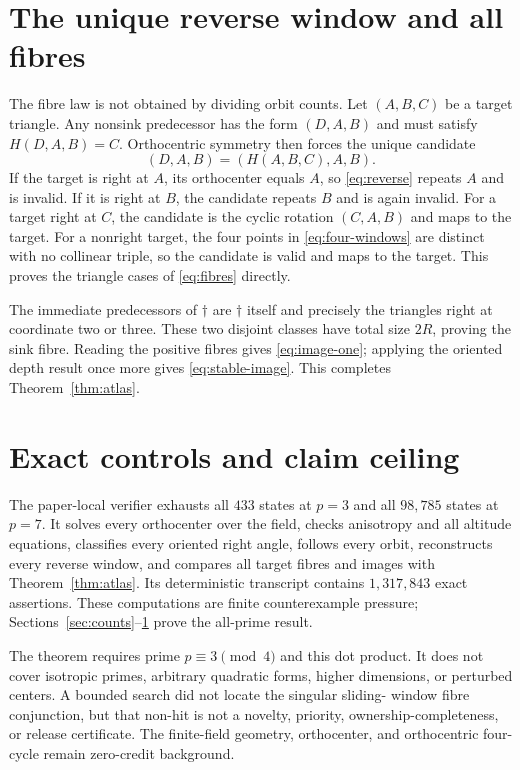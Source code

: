 \documentclass[a4paper,10pt]{amsart}
\theoremstyle{remark}
\begin{document}
\section{The unique reverse window and all fibres}\label{sec:inverse}

The fibre law is not obtained by dividing orbit counts.  Let $(A,B,C)$ be a
target triangle.  Any nonsink predecessor has the form $(D,A,B)$ and must
satisfy $H(D,A,B)=C$.  Orthocentric symmetry then forces the unique candidate
\begin{equation}\label{eq:reverse}
 (D,A,B)=(H(A,B,C),A,B).
\end{equation}
If the target is right at $A$, its orthocenter equals $A$, so
\eqref{eq:reverse} repeats $A$ and is invalid.  If it is right at $B$, the
candidate repeats $B$ and is again invalid.  For a target right at $C$, the
candidate is the cyclic rotation $(C,A,B)$ and maps to the target.  For a
nonright target, the four points in \eqref{eq:four-windows} are distinct with
no collinear triple, so the candidate is valid and maps to the target.
This proves the triangle cases of \eqref{eq:fibres} directly.

The immediate predecessors of $\dagger$ are $\dagger$ itself and precisely
the triangles right at coordinate two or three.  These two disjoint classes
have total size $2R$, proving the sink fibre.  Reading the positive fibres
gives \eqref{eq:image-one}; applying the oriented depth result once more gives
\eqref{eq:stable-image}.  This completes Theorem~\ref{thm:atlas}.

\section{Exact controls and claim ceiling}\label{sec:controls}

The paper-local verifier exhausts all $433$ states at $p=3$ and all
$98{,}785$ states at $p=7$.  It solves every orthocenter over the field,
checks anisotropy and all altitude equations, classifies every oriented right
angle, follows every orbit, reconstructs every reverse window, and compares
all target fibres and images with Theorem~\ref{thm:atlas}.  Its deterministic
transcript contains $1{,}317{,}843$ exact assertions.  These computations are
finite counterexample pressure; Sections~\ref{sec:counts}--\ref{sec:inverse}
prove the all-prime result.

The theorem requires prime $p\equiv3\pmod4$ and this dot product.  It does
not cover isotropic primes, arbitrary quadratic forms, higher dimensions, or
perturbed centers.  A bounded search did not locate the singular sliding-
window fibre conjunction, but that non-hit is not a novelty, priority,
ownership-completeness, or release certificate.  The finite-field geometry,
orthocenter, and orthocentric four-cycle remain zero-credit background.
\end{document}
